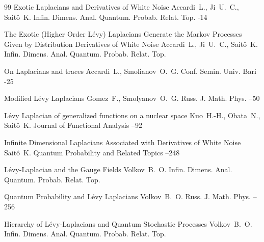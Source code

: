 \begin{thebibliography}{99}
\paper  Exotic Laplacians and  Derivatives of White Noise
\by Accardi~L., Ji~U.~C., Sait\^{o}~K.
\jour Infin. Dimens. Anal. Quantum. Probab. Relat. Top. 
-14



\paper  The Exotic (Higher Order L\'{e}vy) Laplacians Generate the Markov Processes Given by Distribution Derivatives of White  Noise
\by  Accardi~L., Ji~U.~C., Sait\^{o}~K.
\jour Infin. Dimens. Anal. Quantum. Probab. Relat. Top. 


\paper  On Laplacians and traces
\by  Accardi~L., Smolianov~O.~G.
\jour Conf. Semin. Univ. Bari
-25



\paper Modified L\'{e}vy Laplacians
\by Gomez~F., Smolyanov~O.~G.
\jour Russ. J. Math. Phys.
--50


\paper  L\'{e}vy Laplacian of generalized functions on a nuclear space
\by Kuo~H.-H., Obata~N., Sait\^{o}~K.
\jour Journal of Functional Analysis
--92


\paper Infinite Dimensional Laplacians Associated with Derivatives of White Noise
\by Sait\^{o}~K.
\jour  Quantum Probability and Related Topics
--248




\paper L\'evy-Laplacian and the Gauge Fields
\by Volkov~B.~O.
\jour Infin. Dimens. Anal. Quantum. Probab. Relat. Top. 



\paper Quantum Probability and L\'evy Laplacians
\by Volkov~B.~O.
\jour Russ. J. Math. Phys.
--256


\paper Hierarchy of L\'evy-Laplacians and Quantum Stochastic Processes
\by Volkov~B.~O.
\jour Infin. Dimens. Anal. Quantum. Probab. Relat. Top. 



\end{thebibliography}
